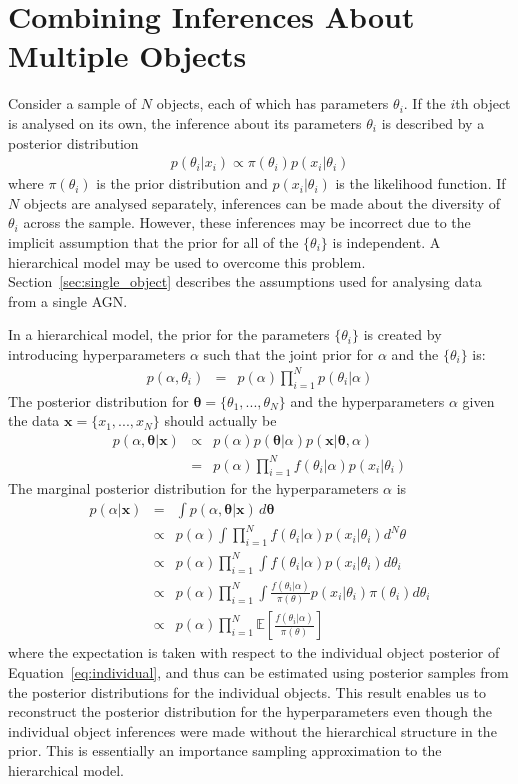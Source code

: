 \documentclass[useAMS,usenatbib]{mn2e}
\renewcommand{\btheta}{\boldsymbol{\theta}}
\newcommand{\bx}{\boldsymbol{x}}
\begin{document}
\section{Combining Inferences About Multiple Objects}
Consider a sample of $N$ objects, each of which has parameters $\theta_i$.
If the $i$th object is analysed on its own, the inference about 
its parameters $\theta_i$ is described by a posterior distribution
\begin{eqnarray}
p(\theta_i | x_i) \propto \pi(\theta_i)p(x_i | \theta_i)\label{eq:individual}
\end{eqnarray}
where $\pi(\theta_i)$ is the prior distribution and $p(x_i | \theta_i)$ is the
likelihood function. If $N$ objects are analysed separately, inferences can
be made about the diversity of $\theta_i$ across the sample. However, these
inferences may be incorrect due to the implicit assumption that the prior for
all of the $\{\theta_i\}$ is independent.
A hierarchical model may be used to overcome this problem.
Section~\ref{sec:single_object} describes the assumptions used for analysing
data from a single AGN.

In a hierarchical model, the prior for the parameters $\{\theta_i\}$ is created
by introducing hyperparameters $\alpha$ such that the joint prior for $\alpha$
and the $\{\theta_i\}$ is:
\begin{eqnarray}
p(\alpha, \theta_i) &=& p(\alpha)\prod_{i=1}^N p(\theta_i | \alpha)
\end{eqnarray}
The posterior distribution for
$\btheta = \{\theta_1, ..., \theta_N\}$ and the hyperparameters $\alpha$
given the data 
$\bx = \{x_1, ..., x_N\}$
should actually be
\begin{eqnarray}
p(\alpha, \btheta | \bx) &\propto&
p(\alpha)p(\btheta|\alpha)p(\bx | \btheta, \alpha)\\
&=& p(\alpha)\prod_{i=1}^N f(\theta_i|\alpha)p(x_i | \theta_i)
\end{eqnarray}
The marginal posterior distribution for the hyperparameters $\alpha$ is
\begin{eqnarray}
p(\alpha | \bx) &=&
\int p(\alpha, \btheta|\bx) \, d\btheta\\
&\propto& p(\alpha)\int \prod_{i=1}^N f(\theta_i|\alpha)p(x_i | \theta_i) d^N\theta\\
&\propto& p(\alpha) \prod_{i=1}^N \int f(\theta_i|\alpha)p(x_i | \theta_i) d\theta_i\\
&\propto& p(\alpha) \prod_{i=1}^N \int \frac{f(\theta_i|\alpha)}{\pi(\theta)}p(x_i | \theta_i) \pi(\theta_i)d\theta_i\\
&\propto& p(\alpha) \prod_{i=1}^N \mathds{E}\left[\frac{f(\theta_i|\alpha)}{\pi(\theta)}\right]
\end{eqnarray}
where the expectation is taken with respect to the individual object posterior
of Equation~\ref{eq:individual}, and thus can be estimated using posterior
samples from the posterior distributions for the individual objects.
This result enables us to reconstruct the
posterior distribution for the hyperparameters even though the individual object
inferences were made without the hierarchical structure in the prior. This is
essentially an importance sampling approximation to the hierarchical model.
\end{document}
